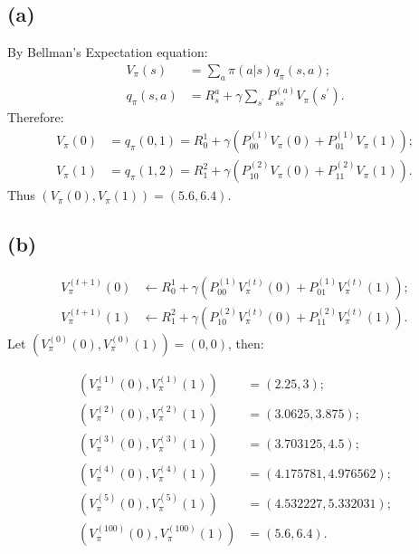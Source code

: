 \documentclass[12pt]{article}
\begin{document}
\subsection*{(a)}
By Bellman's Expectation equation:
\begin{align*}
V_{\pi}(s) &= \sum_a \pi(a | s) q_{\pi}(s,a); \\
q_{\pi}(s,a) & = R_s^a + \gamma \sum_{s^{'}} P_{s s^{'}}^{(a)} V_{\pi}(s^{'}).
\end{align*}
Therefore:
\begin{align*}
V_{\pi}(0) & = q_{\pi}(0,1) = R_0^1 + \gamma (P_{00}^{(1)} V_{\pi}(0) + P_{01}^{(1)} V_{\pi}(1) ); \\
V_{\pi}(1) & = q_{\pi}(1,2) = R_1^2 + \gamma (P_{10}^{(2)} V_{\pi}(0) + P_{11}^{(2)} V_{\pi}(1) ).
\end{align*}
Thus $(V_{\pi}(0), V_{\pi}(1)) = (5.6, 6.4)$.


\subsection*{(b)}
\begin{align*}
V_{\pi}^{(t+1)}(0) & \leftarrow R_0^1 + \gamma (P_{00}^{(1)} V_{\pi}^{(t)}(0) + P_{01}^{(1)} V_{\pi}^{(t)}(1) ); \\
V_{\pi}^{(t+1)}(1) & \leftarrow R_1^2 + \gamma (P_{10}^{(2)} V_{\pi}^{(t)}(0) + P_{11}^{(2)} V_{\pi}^{(t)}(1) ).
\end{align*}
Let  $(V_{\pi}^{(0)}(0), V_{\pi}^{(0)}(1)) = (0, 0)$, then:

\begin{align*}
 (V_{\pi}^{(1)}(0), V_{\pi}^{(1)}(1)) &= (2.25, 3); \\
 (V_{\pi}^{(2)}(0), V_{\pi}^{(2)}(1)) &= (3.0625, 3.875); \\
 (V_{\pi}^{(3)}(0), V_{\pi}^{(3)}(1)) &= (3.703125, 4.5); \\
 (V_{\pi}^{(4)}(0), V_{\pi}^{(4)}(1)) &= (4.175781, 4.976562); \\
 (V_{\pi}^{(5)}(0), V_{\pi}^{(5)}(1)) &= (4.532227, 5.332031); \\
 (V_{\pi}^{(100)}(0), V_{\pi}^{(100)}(1)) &= (5.6, 6.4).
\end{align*}
\end{document}

